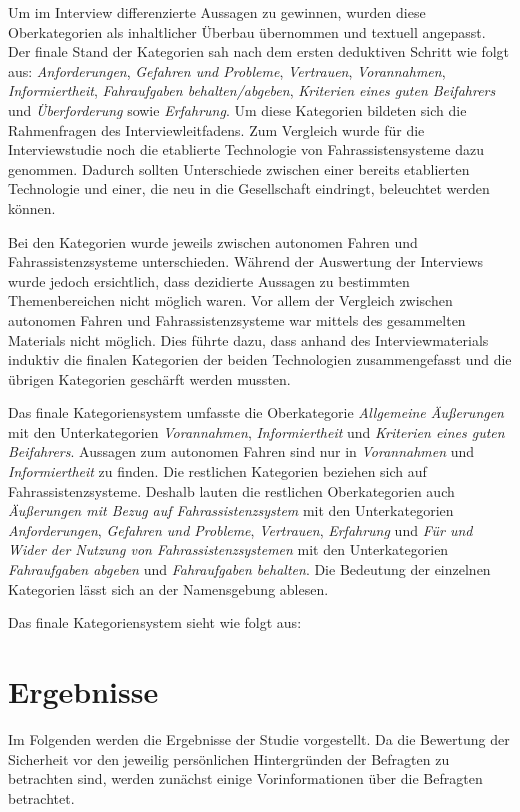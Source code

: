 \documentclass[12pt]{article}
\begin{document}
Um im Interview differenzierte Aussagen zu gewinnen, wurden diese Oberkategorien als inhaltlicher Überbau übernommen und textuell angepasst. Der finale Stand der Kategorien sah nach dem ersten deduktiven Schritt wie folgt aus: \emph{Anforderungen},  \emph{Gefahren und Probleme}, \emph{Vertrauen}, \emph{Vorannahmen}, \emph{Informiertheit}, \emph{Fahraufgaben behalten/abgeben}, \emph{Kriterien eines guten Beifahrers} und \emph{Überforderung} sowie \emph{Erfahrung}. Um diese Kategorien bildeten sich die Rahmenfragen des Interviewleitfadens. Zum Vergleich wurde für die Interviewstudie noch die etablierte Technologie von Fahrassistensysteme dazu genommen. Dadurch sollten Unterschiede zwischen einer bereits etablierten Technologie und einer, die neu in die Gesellschaft eindringt, beleuchtet werden können.

Bei den Kategorien wurde jeweils zwischen autonomen Fahren und Fahrassistenzsysteme unterschieden. Während der Auswertung der Interviews wurde jedoch ersichtlich, dass dezidierte Aussagen zu bestimmten Themenbereichen nicht möglich waren. Vor allem der Vergleich zwischen autonomen Fahren und Fahrassistenzsysteme war mittels des gesammelten Materials nicht möglich. Dies führte dazu, dass anhand des Interviewmaterials induktiv die finalen Kategorien der beiden Technologien zusammengefasst und die übrigen Kategorien geschärft werden mussten. %

Das finale Kategoriensystem umfasste die Oberkategorie \emph{Allgemeine Äußerungen} mit den Unterkategorien \emph{Vorannahmen}, \emph{Informiertheit} und \emph{Kriterien eines guten Beifahrers}. Aussagen zum autonomen Fahren sind nur in \emph{Vorannahmen} und \emph{Informiertheit} zu finden. Die restlichen Kategorien beziehen sich auf Fahrassistenzsysteme. Deshalb lauten die restlichen Oberkategorien auch \emph{Äußerungen mit Bezug auf Fahrassistenzsystem} mit den Unterkategorien \emph{Anforderungen}, \emph{Gefahren und Probleme}, \emph{Vertrauen}, \emph{Erfahrung} und \emph{Für und Wider der Nutzung von Fahrassistenzsystemen} mit den Unterkategorien \emph{Fahraufgaben abgeben} und \emph{Fahraufgaben behalten}. Die Bedeutung der einzelnen Kategorien lässt sich an der Namensgebung ablesen.

Das finale Kategoriensystem sieht wie folgt aus:


\clearpage
\section{Ergebnisse}
Im Folgenden werden die Ergebnisse der Studie vorgestellt. Da die Bewertung der Sicherheit vor den jeweilig persönlichen Hintergründen der Befragten zu betrachten sind, werden zunächst einige Vorinformationen über die Befragten betrachtet.
\end{document}
